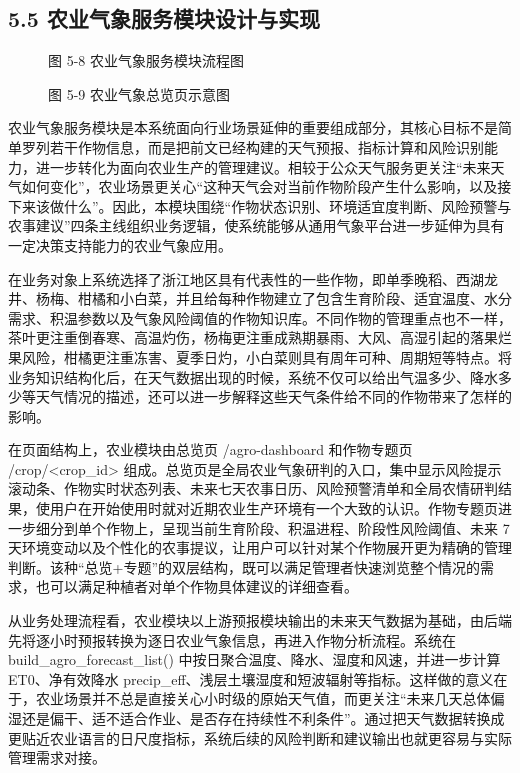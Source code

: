 \subsection{5.5 农业气象服务模块设计与实现}

\begin{figure}[htbp]
\centering
\caption{图 5-8  农业气象服务模块流程图}
\label{fig:5-8}
\end{figure}

\begin{figure}[htbp]
\centering
\caption{图 5-9  农业气象总览页示意图}
\label{fig:5-9}
\end{figure}

农业气象服务模块是本系统面向行业场景延伸的重要组成部分，其核心目标不是简单罗列若干作物信息，而是把前文已经构建的天气预报、指标计算和风险识别能力，进一步转化为面向农业生产的管理建议。相较于公众天气服务更关注“未来天气如何变化”，农业场景更关心“这种天气会对当前作物阶段产生什么影响，以及接下来该做什么”。因此，本模块围绕“作物状态识别、环境适宜度判断、风险预警与农事建议”四条主线组织业务逻辑，使系统能够从通用气象平台进一步延伸为具有一定决策支持能力的农业气象应用。

在业务对象上系统选择了浙江地区具有代表性的一些作物，即单季晚稻、西湖龙井、杨梅、柑橘和小白菜，并且给每种作物建立了包含生育阶段、适宜温度、水分需求、积温参数以及气象风险阈值的作物知识库。不同作物的管理重点也不一样，茶叶更注重倒春寒、高温灼伤，杨梅更注重成熟期暴雨、大风、高湿引起的落果烂果风险，柑橘更注重冻害、夏季日灼，小白菜则具有周年可种、周期短等特点。将业务知识结构化后，在天气数据出现的时候，系统不仅可以给出气温多少、降水多少等天气情况的描述，还可以进一步解释这些天气条件给不同的作物带来了怎样的影响。

在页面结构上，农业模块由总览页 /agro-dashboard 和作物专题页 /crop/<crop\_id> 组成。总览页是全局农业气象研判的入口，集中显示风险提示滚动条、作物实时状态列表、未来七天农事日历、风险预警清单和全局农情研判结果，使用户在开始使用时就对近期农业生产环境有一个大致的认识。作物专题页进一步细分到单个作物上，呈现当前生育阶段、积温进程、阶段性风险阈值、未来 7 天环境变动以及个性化的农事提议，让用户可以针对某个作物展开更为精确的管理判断。该种“总览+专题”的双层结构，既可以满足管理者快速浏览整个情况的需求，也可以满足种植者对单个作物具体建议的详细查看。

从业务处理流程看，农业模块以上游预报模块输出的未来天气数据为基础，由后端先将逐小时预报转换为逐日农业气象信息，再进入作物分析流程。系统在 build\_agro\_forecast\_list() 中按日聚合温度、降水、湿度和风速，并进一步计算 ET0、净有效降水 precip\_eff、浅层土壤湿度和短波辐射等指标。这样做的意义在于，农业场景并不总是直接关心小时级的原始天气值，而更关注“未来几天总体偏湿还是偏干、适不适合作业、是否存在持续性不利条件”。通过把天气数据转换成更贴近农业语言的日尺度指标，系统后续的风险判断和建议输出也就更容易与实际管理需求对接。

